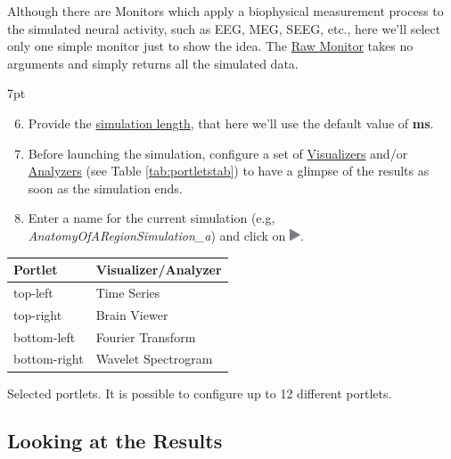 \documentclass{tufte-handout}
\newenvironment{simulation}{%
  \def\FrameCommand{%
    \hspace{1pt}%
    {\color{ForestGreen}\vrule width 2pt}%
    {\color{simulationshade}\vrule width 4pt}%
    \colorbox{simulationshade}%
  }%
  \MakeFramed{\advance\hsize-\width\FrameRestore}%
  \noindent\hspace{-4.55pt}%
  \begin{adjustwidth}{}{7pt}%
  \vspace{2pt}\vspace{2pt}%
}
{%
  \vspace{2pt}\end{adjustwidth}\endMakeFramed%
}
\begin{document}
Although there are Monitors which apply a biophysical measurement process to
the simulated neural activity, such as EEG, MEG, SEEG, etc.,  here we'll select only
one simple monitor just to show the idea. The \underline{Raw Monitor} takes no arguments
and simply returns all the simulated data. 


\begin{simulation}
\begin{enumerate}[resume]
  \setcounter{enumi}{5}
 \item Provide the \underline{simulation length}, that here we'll use the default value of \textbf{\unit[1000]{ms}}.
 \item Before launching the simulation, configure a set of \underline{Visualizers} and/or \underline{Analyzers} (see Table \ref{tab:portletstab}) to have a glimpse of the results as soon as the simulation ends. 
 \item Enter a name for the current simulation (e.g, \textit{AnatomyOfARegionSimulation\_a}) and click on  \includegraphics[width=0.025\textwidth]{butt_launch_project.png}.
\end{enumerate}
\end{simulation}

\begin{margintable}
  \centering
  \selectfont
  \begin{tabular}{ll}
    \toprule
    Portlet & Visualizer/Analyzer \\
    \midrule
             top-left          &   Time Series   \\
             top-right        &   Brain Viewer\\
             bottom-left    &   Fourier Transform        \\
             bottom-right  &   Wavelet Spectrogram \\
    \bottomrule
  \end{tabular}
  \caption{Selected portlets. It is possible to configure up to 12 different portlets. }
  \label{tab:portletstab}
\end{margintable}


\subsection{Looking at the Results}\label{sec:results}
\end{document}
